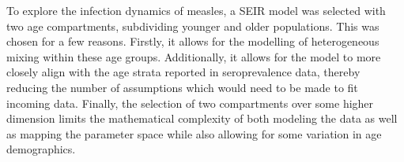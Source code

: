 \documentclass[../Paper.tex]{subfiles}
\begin{document}
  To explore the infection dynamics of measles, a SEIR model was selected with two
  age compartments, subdividing younger and older populations. This was chosen for a few
  reasons. Firstly, it allows for the modelling of heterogeneous mixing within
  these age groups. Additionally, it allows for the model to more closely
  align with the age strata reported in seroprevalence data, thereby reducing the
  number of assumptions which would need to be made to fit incoming data.
  Finally, the selection of two compartments over some higher dimension limits
  the mathematical complexity of both modeling the data as well as mapping the
  parameter space while also allowing for some variation in age demographics.

  \clearpage
\end{document}
